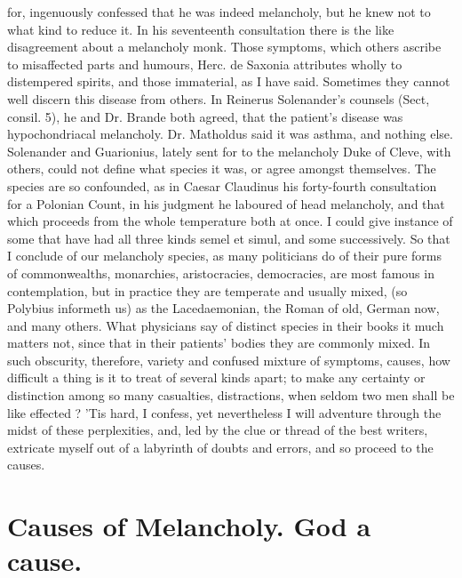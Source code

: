 {{for, ingenuously confessed that he was indeed melancholy, but he knew
not to what kind to reduce it. In his seventeenth consultation there is
the like disagreement about a melancholy monk. Those symptoms, which
others ascribe to misaffected parts and humours, Herc. de Saxonia
attributes wholly to distempered spirits, and those immaterial, as I
have said. Sometimes they cannot well discern this disease from others.
In Reinerus Solenander's counsels (Sect, consil. 5), he and Dr. Brande
both agreed, that the patient's disease was hypochondriacal melancholy.
Dr. Matholdus said it was asthma, and nothing else. Solenander
and Guarionius, lately sent for to the melancholy Duke of Cleve, with
others, could not define what species it was, or agree amongst
themselves. The species are so confounded, as in Caesar Claudinus his
forty-fourth consultation for a Polonian Count, in his judgment
he laboured of head melancholy, and that which proceeds from the
whole temperature both at once. I could give instance of some that have
had all three kinds semel et simul, and some successively. So that I
conclude of our melancholy species, as many politicians do of
their pure forms of commonwealths, monarchies, aristocracies,
democracies, are most famous in contemplation, but in practice they are
temperate and usually mixed, (so Polybius informeth us) as the
Lacedaemonian, the Roman of old, German now, and many others. What
physicians say of distinct species in their books it much matters not,
since that in their patients' bodies they are commonly mixed. In such
obscurity, therefore, variety and confused mixture of symptoms, causes,
how difficult a thing is it to treat of several kinds apart; to make
any certainty or distinction among so many casualties, distractions,
when seldom two men shall be like effected ? 'Tis hard, I
confess, yet nevertheless I will adventure through the midst of these
perplexities, and, led by the clue or thread of the best writers,
extricate myself out of a labyrinth of doubts and errors, and so
proceed to the causes.



\section{Causes of Melancholy. God a cause.}

}}

